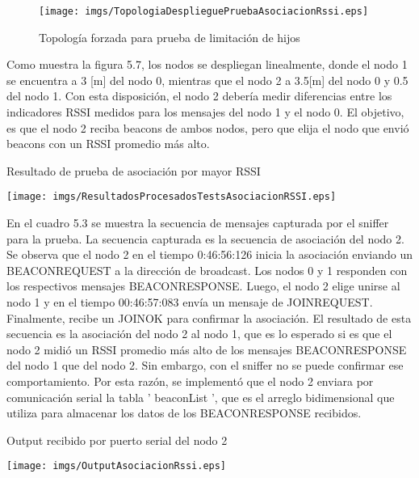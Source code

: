\begin{figure}[H]
	\centering
 	\texttt{[image: imgs/TopologiaDesplieguePruebaAsociacionRssi.eps]} 
 	\caption{Topología forzada para prueba de limitación de hijos}
\end{figure}

Como muestra la figura 5.7, los nodos se despliegan linealmente, donde el nodo 1 se encuentra a 3 [m] del nodo 0, mientras que el nodo 2 a 3.5[m] del nodo 0 y 0.5 del nodo 1. Con esta disposición, el nodo 2 debería medir diferencias entre los indicadores RSSI medidos para los mensajes del nodo 1 y el nodo 0.  El objetivo, es que el nodo 2 reciba beacons de ambos nodos, pero que elija el nodo que envió beacons con un RSSI promedio más alto. 

\begin{center}
\begin{table}[H]
\caption{Resultado de prueba de asociación por mayor RSSI}
 \texttt{[image: imgs/ResultadosProcesadosTestsAsociacionRSSI.eps]}
\end{table}
\end{center}

En el cuadro 5.3 se muestra la secuencia de mensajes capturada por el sniffer para la prueba. La secuencia capturada es la secuencia de asociación del nodo 2. Se observa que el nodo 2 en el tiempo 0:46:56:126 inicia la asociación enviando un BEACON\textunderscore REQUEST a la dirección de broadcast. Los nodos 0 y 1 responden con los respectivos mensajes BEACON\textunderscore RESPONSE. Luego, el nodo 2 elige unirse al nodo 1 y en el tiempo 00:46:57:083 envía un mensaje de JOIN\textunderscore REQUEST. Finalmente, recibe un JOIN\textunderscore OK para confirmar la asociación. El resultado de esta secuencia es la asociación del nodo 2 al nodo 1, que es lo esperado si es que el nodo 2 midió un RSSI promedio más alto de los mensajes BEACON\textunderscore RESPONSE del nodo 1 que del nodo 2. Sin embargo, con el sniffer no se puede confirmar ese comportamiento. Por esta razón, se implementó que el nodo 2 enviara por comunicación serial la tabla ' beaconList ', que es el arreglo bidimensional que utiliza para almacenar los datos de los BEACON\textunderscore RESPONSE recibidos.\\

\begin{center}
\begin{table}[H]
\caption{Output recibido por puerto serial del nodo 2}
 \texttt{[image: imgs/OutputAsociacionRssi.eps]}
\end{table}
\end{center}

